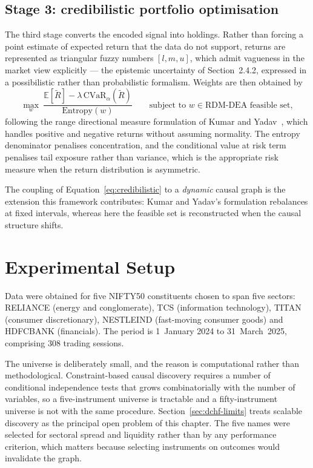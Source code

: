 \subsection{Stage 3: credibilistic portfolio optimisation}

The third stage converts the encoded signal into holdings. Rather than forcing a point estimate
of expected return that the data do not support, returns are represented as triangular fuzzy
numbers $[l, m, u]$, which admit vagueness in the market view explicitly --- the epistemic
uncertainty of Section~2.4.2, expressed in a possibilistic rather than probabilistic
formalism. Weights are then obtained by
\begin{equation}
\max_{w}\ \frac{\mathbb{E}[\tilde{R}] - \lambda\,\mathrm{CVaR}_{\alpha}(\tilde{R})}
{\mathrm{Entropy}(w)}
\qquad \text{subject to } w \in \text{RDM-DEA feasible set},
\label{eq:credibilistic}
\end{equation}
following the range directional measure formulation of Kumar and Yadav~\cite{kumar2024rdmdea},
which handles positive and negative returns without assuming normality. The entropy denominator
penalises concentration, and the conditional value at risk term penalises tail exposure rather
than variance, which is the appropriate risk measure when the return distribution is asymmetric.

The coupling of Equation~\eqref{eq:credibilistic} to a \emph{dynamic} causal graph is the
extension this framework contributes: Kumar and Yadav's formulation rebalances at fixed intervals,
whereas here the feasible set is reconstructed when the causal structure shifts.

\section{Experimental Setup}
\label{sec:dchf-setup}

Data were obtained for five NIFTY50 constituents chosen to span five sectors: RELIANCE (energy
and conglomerate), TCS (information technology), TITAN (consumer discretionary), NESTLEIND
(fast-moving consumer goods) and HDFCBANK (financials). The period is 1~January 2024 to
31~March~2025, comprising 308 trading sessions.

The universe is deliberately small, and the reason is computational rather than methodological.
Constraint-based causal discovery requires a number of conditional independence tests that grows
combinatorially with the number of variables, so a five-instrument universe is tractable and a
fifty-instrument universe is not with the same procedure. Section~\ref{sec:dchf-limits} treats
scalable discovery as the principal open problem of this chapter. The five names were selected for
sectoral spread and liquidity rather than by any performance criterion, which matters because
selecting instruments on outcomes would invalidate the graph.

